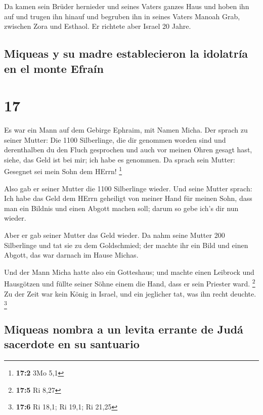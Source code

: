  Da kamen sein Brüder hernieder und seines Vaters ganzes
Haus und hoben ihn auf und trugen ihn hinauf und begruben ihn in seines
Vaters Manoah Grab, zwischen Zora und Esthaol. Er richtete aber Israel
20 Jahre.

\hypertarget{miqueas-y-su-madre-establecieron-la-idolatruxeda-en-el-monte-efrauxedn}{%
\subsection{Miqueas y su madre establecieron la idolatría en el monte
Efraín}\label{miqueas-y-su-madre-establecieron-la-idolatruxeda-en-el-monte-efrauxedn}}

\hypertarget{section-16}{%
\section{17}\label{section-16}}

 Es war ein Mann auf dem Gebirge Ephraim, mit Namen Micha.
 Der sprach zu seiner Mutter: Die 1100 Silberlinge, die
dir genommen worden sind und derenthalben du den Fluch gesprochen und
auch vor meinen Ohren gesagt hast, siehe, das Geld ist bei mir; ich habe
es genommen. Da sprach sein Mutter: Gesegnet sei mein Sohn dem HErrn!
\footnote{\textbf{17:2} 3Mo 5,1}

 Also gab er seiner Mutter die 1100 Silberlinge wieder.
Und seine Mutter sprach: Ich habe das Geld dem HErrn geheiligt von
meiner Hand für meinen Sohn, dass man ein Bildnis und einen Abgott
machen soll; darum so gebe ich's dir nun wieder.

 Aber er gab seiner Mutter das Geld wieder. Da nahm seine
Mutter 200 Silberlinge und tat sie zu dem Goldschmied; der machte ihr
ein Bild und einen Abgott, das war darnach im Hause Michas.

 Und der Mann Micha hatte also ein Gotteshaus; und machte
einen Leibrock und Hausgötzen und füllte seiner Söhne einem die Hand,
dass er sein Priester ward. \footnote{\textbf{17:5} Ri 8,27}
 Zu der Zeit war kein König in Israel, und ein jeglicher
tat, was ihn recht deuchte. \footnote{\textbf{17:6} Ri 18,1; Ri 19,1; Ri
  21,25}

\hypertarget{miqueas-nombra-a-un-levita-errante-de-juduxe1-sacerdote-en-su-santuario}{%
\subsection{Miqueas nombra a un levita errante de Judá sacerdote en su
santuario}\label{miqueas-nombra-a-un-levita-errante-de-juduxe1-sacerdote-en-su-santuario}}

